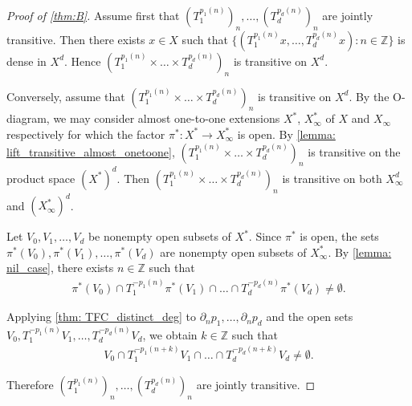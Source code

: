 \documentclass[11pt,reqno]{amsart}
\newcommand{\Z}{\mathbb{Z}}
\theoremstyle{definition}
\theoremstyle{remark}
\begin{document}
\begin{proof}[Proof of \cref{thm:B}]
    Assume first that $(T_1^{p_1(n)})_{n},\dots,(T_d^{p_d(n)})_{n}$ are jointly transitive. Then there exists $x\in X$ such that $\{(T_1^{p_1(n)}x,\dots,T_d^{p_d(n)}x):n\in \Z\}$ is dense in $X^d$. Hence $(T_1^{p_1(n)}\times \dots\times T_{d}^{p_{d}(n)})_{n}$ is transitive on $X^d$.
    
    Conversely, assume that $(T_1^{p_1(n)}\times \dots\times T_{d}^{p_{d}(n)})_{n}$ is transitive on  $X^d$. By the O-diagram, we may consider almost one-to-one extensions $X^*$, $X_\infty^*$ of $X$ and $X_\infty$ respectively for which the factor $\pi^*: X^{*}\to X_\infty^*$ is open. By \cref{lemma: lift_transitive_almost_onetoone}, $(T_1^{p_1(n)}\times \dots\times T_{d}^{p_{d}(n)})_{n}$ is transitive on the product space $(X^*)^d$. Then $(T_1^{p_1(n)}\times \dots\times T_{d}^{p_{d}(n)})_{n}$ is transitive on both $X_\infty^d$ and $(X_\infty^*)^d$.

    Let $V_0,V_1,\dots,V_d$ be nonempty open subsets of $X^*$. Since $\pi^*$ is open, the sets $\pi^*(V_0),\pi^*(V_1),\dots,\pi^*(V_d)$ are nonempty open subsets of $X_\infty^*$. By \cref{lemma: nil_case}, there exists $n\in \Z$ such that \begin{align*}
        \pi^{*}(V_0)\cap T_1^{-p_1(n)}\pi^*(V_1) \cap\dots\cap T_d^{-p_d(n)}\pi^*(V_d)\neq \emptyset.
    \end{align*}

    Applying \cref{thm: TFC_distinct_deg} to $\partial_n p_1,\dots,\partial_n p_d$ and the open sets $V_0, T_1^{-p_1(n)}V_1, \dots, T_d^{-p_d(n)}V_d$, we obtain $k\in \Z$ such that\begin{align*}
            V_0\cap T_1^{-p_1(n+k)}V_1\cap \dots\cap T_d^{-p_d(n+k)}V_d \neq \emptyset.
    \end{align*}

    Therefore $(T_1^{p_1(n)})_n,\dots,(T_d^{p_d(n)})_n$ are jointly transitive.
\end{proof}
\end{document}
